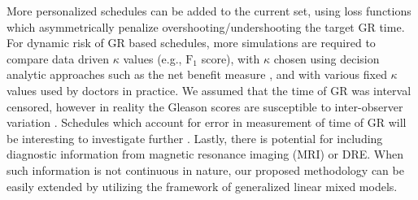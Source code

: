 More personalized schedules can be added to the current set, using loss functions which asymmetrically penalize overshooting/undershooting the target GR time. For dynamic risk of GR based schedules, more simulations are required to compare data driven $\kappa$ values (e.g., $\mbox{F}_1$ score), with $\kappa$ chosen using decision analytic approaches such as the net benefit measure \citep{vickers2006decision}, and with various fixed $\kappa$ values used by doctors in practice. We assumed that the time of GR was interval censored, however in reality the Gleason scores are susceptible to inter-observer variation \citep{Gleason_interobs_var}. Schedules which account for error in measurement of time of GR will be interesting to investigate further \citep{coley2017}. Lastly, there is potential for including diagnostic information from magnetic resonance imaging (MRI) or DRE. When such information is not continuous in nature, our proposed methodology can be easily extended by utilizing the framework of generalized linear mixed models.